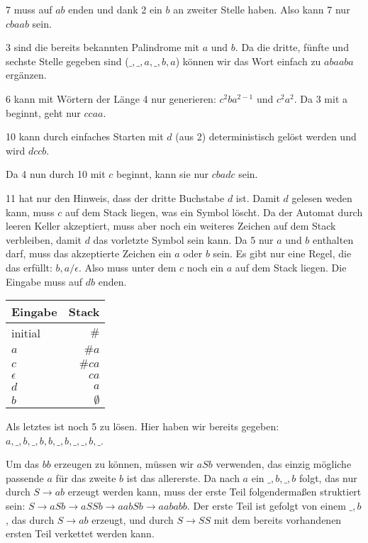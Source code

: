 \documentclass{article}
\begin{document}
\bigskip

7 muss auf $ab$ enden und dank 2 ein $b$ an zweiter Stelle haben. Also kann 7 nur $cbaab$ sein.

\bigskip

3 sind die bereits bekannten Palindrome mit $a$ und $b$. Da die dritte, fünfte und sechste Stelle gegeben sind ($\_,\_,a,\_,b,a$) können wir das Wort einfach zu $abaaba$ ergänzen.

\bigskip

6 kann mit Wörtern der Länge 4 nur generieren: $c^2ba^{2-1}$ und $c^2a^2$. Da 3 mit a beginnt, geht nur $ccaa$.

\bigskip

10 kann durch einfaches Starten mit $d$ (aus 2) deterministisch gelöst werden und wird $dccb$.

\bigskip

Da 4 nun durch 10 mit $c$ beginnt, kann sie nur $cbadc$ sein.

\bigskip

11 hat nur den Hinweis, dass der dritte Buchstabe $d$ ist. Damit $d$ gelesen weden kann, muss $c$ auf dem Stack liegen, was ein Symbol löscht. Da der Automat durch leeren Keller akzeptiert, muss aber noch ein weiteres Zeichen auf dem Stack verbleiben, damit $d$ das vorletzte Symbol sein kann. Da 5 nur $a$ und $b$ enthalten darf, muss das akzeptierte Zeichen ein $a$ oder $b$ sein. Es gibt nur eine Regel, die das erfüllt: $b,a/\epsilon$. Also muss unter dem $c$ noch ein $a$ auf dem Stack liegen. Die Eingabe muss auf $db$ enden.

\begin{table*}[ht]
	\centering
		\begin{tabular}{l|r}
      Eingabe & Stack \\
      \hline
      initial & $\#$ \\
      $a$ & $\# a$ \\
      $c$ & $\# ca$ \\
      $\epsilon$ & $ca$ \\
      $d$ & $a$ \\
      $b$ & $\emptyset$
		\end{tabular}
\end{table*}

\bigskip

Als letztes ist noch 5 zu lösen. Hier haben wir bereits gegeben: \\ $a,\_,b,\_,b,b,\_,b,\_,\_,b,\_$. 

Um das $bb$ erzeugen zu können, müssen wir $aSb$ verwenden, das einzig mögliche passende $a$ für das zweite $b$ ist das allererste. Da nach $a$ ein $\_,b,\_,b$ folgt, das nur durch $S\rightarrow ab$ erzeugt werden kann, muss der erste Teil folgendermaßen struktiert sein: $S \rightarrow aSb \rightarrow aSSb \rightarrow aabSb \rightarrow aababb$.
Der erste Teil ist gefolgt von einem $\_,b$, das durch $S \rightarrow ab$ erzeugt, und durch $S \rightarrow SS$ mit dem bereits vorhandenen ersten Teil verkettet werden kann.
\end{document}

